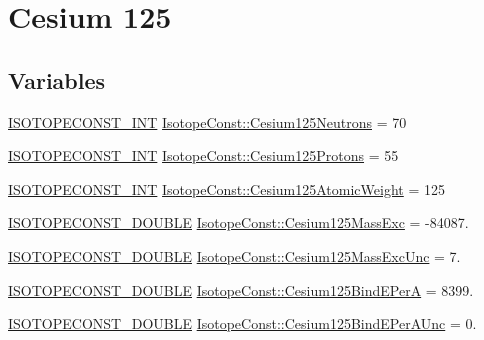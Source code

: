 \hypertarget{group___isotope_const-_cesium-_cs125}{}\section{Cesium 125}
\label{group___isotope_const-_cesium-_cs125}
\subsection*{Variables}
\begin{DoxyCompactItemize}
\item 
\mbox{\hyperlink{group___isotope_const-_macros_ga5f18360b3e99483a35c32d789e62621c}{I\+S\+O\+T\+O\+P\+E\+C\+O\+N\+S\+T\+\_\+\+I\+NT}} \mbox{\hyperlink{group___isotope_const-_cesium-_cs125_ga060297a63119ef280fbb082c0d1f6ac6}{Isotope\+Const\+::\+Cesium125\+Neutrons}} = 70
\item 
\mbox{\hyperlink{group___isotope_const-_macros_ga5f18360b3e99483a35c32d789e62621c}{I\+S\+O\+T\+O\+P\+E\+C\+O\+N\+S\+T\+\_\+\+I\+NT}} \mbox{\hyperlink{group___isotope_const-_cesium-_cs125_ga6a70b7c4d3b765e9a30f5e7ced1350d4}{Isotope\+Const\+::\+Cesium125\+Protons}} = 55
\item 
\mbox{\hyperlink{group___isotope_const-_macros_ga5f18360b3e99483a35c32d789e62621c}{I\+S\+O\+T\+O\+P\+E\+C\+O\+N\+S\+T\+\_\+\+I\+NT}} \mbox{\hyperlink{group___isotope_const-_cesium-_cs125_gaac749da0aa27dc0c158bddc4cbe80c13}{Isotope\+Const\+::\+Cesium125\+Atomic\+Weight}} = 125
\item 
\mbox{\hyperlink{group___isotope_const-_macros_ga8f45a7272ce02c0b4c65c44636ed719a}{I\+S\+O\+T\+O\+P\+E\+C\+O\+N\+S\+T\+\_\+\+D\+O\+U\+B\+LE}} \mbox{\hyperlink{group___isotope_const-_cesium-_cs125_ga2b10064c0228be6287049bd788f81c5d}{Isotope\+Const\+::\+Cesium125\+Mass\+Exc}} = -\/84087.
\item 
\mbox{\hyperlink{group___isotope_const-_macros_ga8f45a7272ce02c0b4c65c44636ed719a}{I\+S\+O\+T\+O\+P\+E\+C\+O\+N\+S\+T\+\_\+\+D\+O\+U\+B\+LE}} \mbox{\hyperlink{group___isotope_const-_cesium-_cs125_gae72059c860f49e21b211562746cffbd2}{Isotope\+Const\+::\+Cesium125\+Mass\+Exc\+Unc}} = 7.
\item 
\mbox{\hyperlink{group___isotope_const-_macros_ga8f45a7272ce02c0b4c65c44636ed719a}{I\+S\+O\+T\+O\+P\+E\+C\+O\+N\+S\+T\+\_\+\+D\+O\+U\+B\+LE}} \mbox{\hyperlink{group___isotope_const-_cesium-_cs125_ga03d56de63b552e8e18d5ec49fc15bbfe}{Isotope\+Const\+::\+Cesium125\+Bind\+E\+PerA}} = 8399.
\item 
\mbox{\hyperlink{group___isotope_const-_macros_ga8f45a7272ce02c0b4c65c44636ed719a}{I\+S\+O\+T\+O\+P\+E\+C\+O\+N\+S\+T\+\_\+\+D\+O\+U\+B\+LE}} \mbox{\hyperlink{group___isotope_const-_cesium-_cs125_ga2564e6d6b13c17d5cc2ea52ddd5d7ca7}{Isotope\+Const\+::\+Cesium125\+Bind\+E\+Per\+A\+Unc}} = 0.

\end{DoxyCompactItemize}
